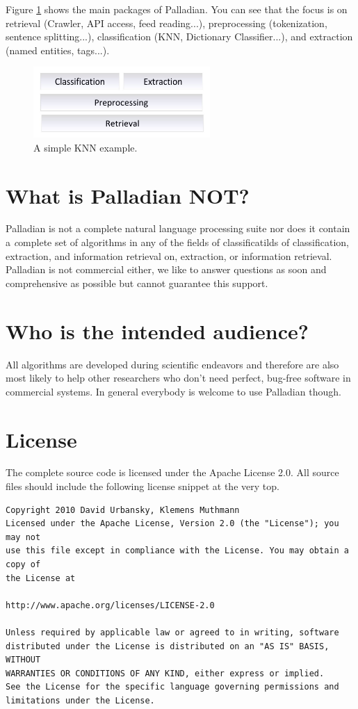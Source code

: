 \documentclass[a4paper,twoside]{book}      %
\begin{document}
Figure \ref{fig:architecture} shows the main packages of Palladian. You can see that the focus is on retrieval (Crawler, API access, feed reading...), preprocessing (tokenization, sentence splitting...), classification (KNN, Dictionary Classifier...), and extraction (named entities, tags...).

\begin{figure}[ht!]
\centering
\includegraphics[width=0.6\textwidth]{img/architecture.pdf}
\caption{A simple KNN example.}
\label{fig:architecture}
\end{figure}

\section{What is Palladian NOT?}
Palladian is not a complete natural language processing suite nor does it contain a {\textit complete} set of algorithms in any of the fields of classificatilds of classification, extraction, and information retrieval on, extraction, or information retrieval. Palladian is not commercial either, we like to answer questions as soon and comprehensive as possible but cannot guarantee this support.

\section{Who is the intended audience?}
All algorithms are developed during scientific endeavors and therefore are also most likely to help other researchers who don't need perfect, bug-free software in commercial systems. In general everybody is welcome to use Palladian though.

\section{License}
The complete source code is licensed under the Apache License 2.0. All source files should include the following license snippet at the very top.

\begin{verbatim}
Copyright 2010 David Urbansky, Klemens Muthmann
Licensed under the Apache License, Version 2.0 (the "License"); you may not
use this file except in compliance with the License. You may obtain a copy of
the License at

http://www.apache.org/licenses/LICENSE-2.0

Unless required by applicable law or agreed to in writing, software
distributed under the License is distributed on an "AS IS" BASIS, WITHOUT
WARRANTIES OR CONDITIONS OF ANY KIND, either express or implied.
See the License for the specific language governing permissions and
limitations under the License.
\end{verbatim}
\end{document}
